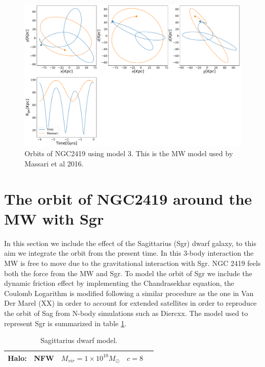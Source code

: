 \documentclass[14pt]{article}
\begin{document}
\begin{figure}[H]
\centering
\includegraphics[scale=0.3]{../exploratory_code/NGC2419_Triaxial_MW.pdf}
\caption{Orbits of NGC2419 using model 3. This is the MW model used by
Massari et al 2016.}
\end{figure}



\section{The orbit of NGC2419 around the MW with Sgr}\label{sec:NGCSgr}

In this section we include the effect of the Sagittarius (Sgr) dwarf
galaxy, to this aim we integrate the orbit from the present time. In
this 3-body interaction the MW is free to move due to the
gravitational interaction with Sgr. NGC 2419 feels both the force
from the MW and Sgr. To model the orbit of Sgr we include the dynamic
friction effect by implementing the Chandrasekhar equation, the
Coulomb Logarithm is modified following a similar procedure as the one
in Van Der Marel (XX) in order to account for extended satellites in 
order to reproduce the orbit of Sag from N-body simulations such as 
Diercxx. The model used to represent Sgr is summarized in table
\ref{tab:Sgrmodel}.


\begin{table}[H]
\centering
\begin{tabular}{c c c c c}
\hline
\hline
Halo: & NFW & $M_{vir} = 1\times 10^{10} M_{\odot}$ & $c=8$  \\
\hline
\hline
\end{tabular}
\caption{Sagittarius dwarf model.\label{tab:Sgrmodel}}
\end{table}
\end{document}
